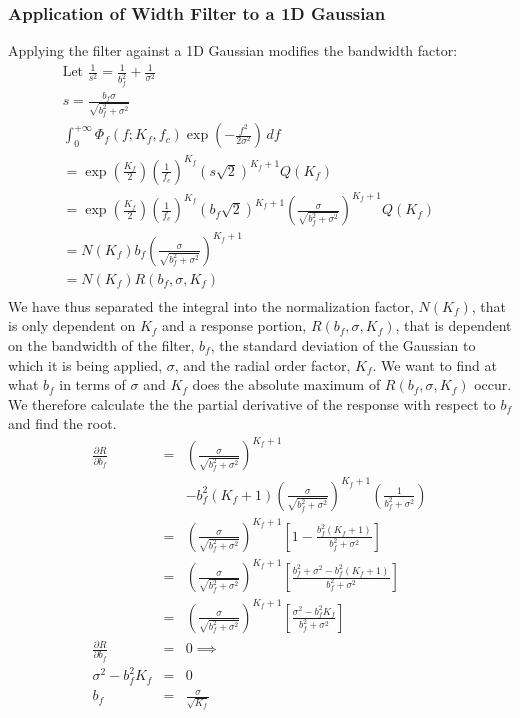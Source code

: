 \documentclass{article}
\begin{document}
\subsubsection{Application of Width Filter to a 1D Gaussian}
Applying the filter against a 1D Gaussian modifies the bandwidth factor:
\begin{eqnarray}
\mbox{Let } \frac{1}{s^2}  =  \frac{1}{b_f^2} + \frac{1}{\sigma^2} \\
s  =  \frac{b_f \sigma}{\sqrt{b_f^2 + \sigma^2}} \\
\int_0^{+\infty} \Phi_f(f; K_f, f_c) \exp(-\frac{f^2}{2 \sigma^2}) \, df & & \\
= \exp \left(\frac{K_f}{2} \right)
            \left( \frac{1}{f_c} \right)^{K_f}
            \left( s \sqrt{2} \right)^{K_f+1}
            Q(K_f) \\
= \exp \left(\frac{K_f}{2} \right)
            \left( \frac{1}{f_c} \right)^{K_f}
            \left( b_f \sqrt{2} \right)^{K_f+1}
            \left(\frac{ \sigma}{\sqrt{b_f^2 + \sigma^2}} \right)^{K_f+1}
            Q(K_f) \\
= N(K_f) b_f \left(\frac{ \sigma}{\sqrt{b_f^2 + \sigma^2}} \right)^{K_f+1} \\
= N(K_f) R(b_f, \sigma, K_f) \\
\end{eqnarray}
We have thus separated the integral into the normalization factor, $ N(K_f) $, that is only dependent on $ K_f $ and a response portion, $ R(b_f, \sigma, K_f) $, that is dependent on the bandwidth of the filter, $ b_f $, the standard deviation of the Gaussian to which it is being applied, $ \sigma $, and the radial order factor, $  K_f $. We want to find at what $ b_f $ in terms of $ \sigma $ and $ K_f $ does the absolute maximum of $R(b_f, \sigma, K_f) $ occur. We therefore calculate the the partial derivative of the response with respect to $ b_f $ and find the root.
\begin{eqnarray}
\frac{\partial R}{\partial b_f} & = & \left(\frac{ \sigma}{\sqrt{b_f^2 + \sigma^2}} \right)^{K_f+1}
  \\ & & -b_f^2 (K_f + 1) \left(\frac{ \sigma}{\sqrt{b_f^2 + \sigma^2}} \right)^{K_f+1}
   \left( \frac{1}{b_f^2+\sigma^2}  \right) \\
  & = & \left(\frac{ \sigma}{\sqrt{b_f^2 + \sigma^2}} \right)^{K_f+1}
        \left[ 1  - \frac{b_f^2 (K_f+1)}{b_f^2 + \sigma^2} \right] \\
  & = & \left(\frac{ \sigma}{\sqrt{b_f^2 + \sigma^2}} \right)^{K_f+1}
        \left[ \frac{b_f^2 + \sigma^2 - b_f^2 (K_f+1)}{b_f^2 + \sigma^2} \right] \\
  & = & \left(\frac{ \sigma}{\sqrt{b_f^2 + \sigma^2}} \right)^{K_f+1}
        \left[ \frac{\sigma^2 - b_f^2 K_f}{b_f^2 + \sigma^2} \right] \\
\frac{\partial R}{\partial b_f} & = & 0 \implies \\
\sigma^2 - b_f^2 K_f & = & 0 \\
b_f & = & \frac{\sigma}{\sqrt{K_f}}
\end{eqnarray}
\end{document}

